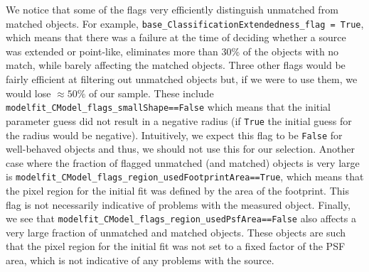 \documentclass[\docopts]{\docclass}
\begin{document}
We notice that some of the flags very efficiently distinguish unmatched from matched objects. For example, \texttt{base\_ClassificationExtendedness\_flag = True}, which means that there was a failure at the time of deciding whether a source was extended or point-like, eliminates more than 30\% of the objects with no match, while barely affecting the matched objects. Three other flags would be fairly efficient at filtering out unmatched objects but, if we were to use them, we would lose $\approx 50\%$ of our sample. These include \texttt{modelfit\_CModel\_flags\_smallShape==False} which means that the initial parameter guess did not result in a negative radius (if \texttt{True} the initial guess for the radius would be negative). Intuitively, we expect this flag to be \texttt{False} for well-behaved objects and thus, we should not use this for our selection. Another case where the fraction of flagged unmatched (and matched) objects is very large is \texttt{modelfit\_CModel\_flags\_region\_usedFootprintArea==True}, which means that the pixel region for the initial fit was defined by the area of the footprint. This flag is not necessarily indicative of problems with the measured object. Finally, we see that \texttt{modelfit\_CModel\_flags\_region\_usedPsfArea==False} also affects a very large fraction of unmatched and matched objects. These objects are such that the pixel region for the initial fit was not set to a fixed factor of the PSF area, which is not indicative of any problems with the source.
\end{document}
